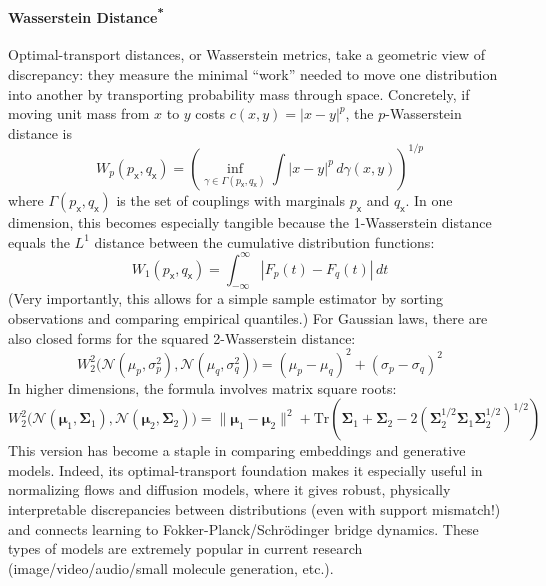\paragraph*{\texorpdfstring{Wasserstein Distance\textsuperscript{*}}{Wasserstein Distance}} Optimal-transport distances, or Wasserstein metrics, take a geometric view of discrepancy: they measure the minimal ``work'' needed to move one distribution into another by transporting probability mass through space. Concretely, if moving unit mass from $x$ to $y$ costs $c(x,y)=|x-y|^p$, the $p$-Wasserstein distance is
\begin{equation}
    W_p(p_{\mathsf{x}},q_{\mathsf{x}})=\left(\inf_{\gamma\in\Gamma(p_{\mathsf{x}},q_{\mathsf{x}})}\int |x-y|^p\,d\gamma(x,y)\right)^{1/p}
\end{equation}
where $\Gamma(p_{\mathsf{x}},q_{\mathsf{x}})$ is the set of couplings with marginals $p_{\mathsf{x}}$ and $q_{\mathsf{x}}$. In one dimension, this becomes especially tangible because the 1-Wasserstein distance equals the $L^1$ distance between the cumulative distribution functions:
\begin{equation}
    W_1(p_{\mathsf{x}},q_{\mathsf{x}})=\int_{-\infty}^{\infty}|F_p(t)-F_q(t)|\,dt
\end{equation}
(Very importantly, this allows for a simple sample estimator by sorting observations and comparing empirical quantiles.) For Gaussian laws, there are also closed forms for the squared 2-Wasserstein distance:
\begin{equation}
    W_2^2\big(\mathcal{N}(\mu_p,\sigma_p^2),\mathcal{N}(\mu_q,\sigma_q^2)\big)=(\mu_p-\mu_q)^2+(\sigma_p-\sigma_q)^2
\end{equation}
In higher dimensions, the formula involves matrix square roots:
\begin{equation}
    W_2^2\big(\mathcal{N}(\boldsymbol{\mu}_1,\boldsymbol{\Sigma}_1),\mathcal{N}(\boldsymbol{\mu}_2,\boldsymbol{\Sigma}_2)\big)=\|\boldsymbol{\mu}_1-\boldsymbol{\mu}_2\|^2+\mathrm{Tr}\!\left(\boldsymbol{\Sigma}_1+\boldsymbol{\Sigma}_2-2\!\left(\boldsymbol{\Sigma}_2^{1/2}\boldsymbol{\Sigma}_1\boldsymbol{\Sigma}_2^{1/2}\right)^{1/2}\right)
\end{equation}
This version has become a staple in comparing embeddings and generative models. Indeed, its optimal-transport foundation makes it especially useful in normalizing flows and diffusion models, where it gives robust, physically interpretable discrepancies between distributions (even with support mismatch!) and connects learning to Fokker-Planck/Schr\"odinger bridge dynamics. These types of models are extremely popular in current research (image/video/audio/small molecule generation, etc.).

